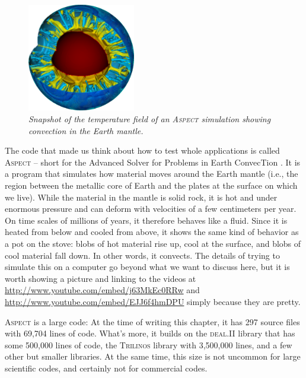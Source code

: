 \documentclass{article}
\newcommand{\dealii}{{\textsc{deal.II}}}
\newcommand{\trilinos}{{\textsc{Trilinos}}}
\newcommand{\aspect}{\textsc{Aspect}}
\begin{document}
\begin{figure}
  \begin{center}
    \vspace*{-24pt}
    \includegraphics[width=0.42\textwidth,height=0.42\textwidth]{figures/aspect.png}
    \vspace*{-12pt}
  \end{center}
  \caption{\it Snapshot of the temperature field of an \aspect{} simulation
    showing convection in the Earth mantle.}
  \vspace*{-3mm}
  \label{fig:aspect}
\end{figure}
The code that made us think about how to test whole applications is called
\aspect{} -- short for the Advanced Solver for Problems in Earth ConvecTion
\cite{...}. It is a program that simulates how material moves around the Earth
mantle (i.e., the region between the metallic core of Earth and the plates at
the surface on which we live). While the material in the mantle is solid rock,
it is hot and under enormous pressure and can deform with velocities of a few
centimeters per year. On time scales of millions of years, it therefore
behaves like a fluid. Since it is heated from below and cooled from above, it
shows the same kind of behavior as a pot on the stove: blobs of hot material
rise up, cool at the surface, and blobs of cool material fall down. In other
words, it convects. The details of trying to simulate this on a computer go
beyond what we want to discuss here, but it is worth showing a picture and
linking to the videos at \url{http://www.youtube.com/embed/j63MkEc0RRw} and
\url{http://www.youtube.com/embed/EJJ6f4hmDPU} simply because they are pretty.

\aspect{} is a large code: At the time of writing this chapter, it has 297
source files with 69,704 lines of code. What's more, it builds on the
\dealii{} library that has some 500,000 lines of code, the \trilinos{} library
with 3,500,000 lines, and a few other but smaller libraries. At the same time,
this size is not uncommon for large scientific codes, and certainly not for
commercial codes.
\end{document}
